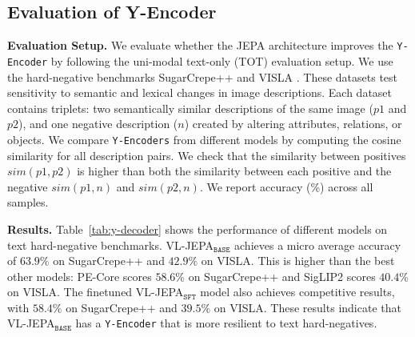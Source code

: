 \subsection{Evaluation of Y-Encoder}
\label{sec:exp.y-encoder}


\textbf{Evaluation Setup.} We evaluate whether the JEPA architecture improves the \texttt{Y-Encoder} by following the uni-modal text-only (TOT) evaluation setup.  
We use the hard-negative benchmarks SugarCrepe++ \citep{10.5555/3737916.3738487} and VISLA \citep{dumpala2024vislabenchmarkevaluatingembedding}.  
These datasets test sensitivity to semantic and lexical changes in image descriptions.  
Each dataset contains triplets: two semantically similar descriptions of the same image ($p1$ and $p2$), and one negative description ($n$) created by altering attributes, relations, or objects.  
We compare \texttt{Y-Encoders} from different models by computing the cosine similarity for all description pairs.  
We check that the similarity between positives $sim(p1,p2)$ is higher than both the similarity between each positive and the negative $sim(p1,n)$ and $sim(p2,n)$.  
We report accuracy (\%) across all samples.


\textbf{Results.} Table~\ref{tab:y-decoder} shows the performance of different models on text hard-negative benchmarks.
VL-JEPA$_\texttt{BASE}$ achieves a micro average accuracy of $63.9\%$ on SugarCrepe++ and $42.9\%$ on VISLA.
This is higher than the best other models: PE-Core scores $58.6\%$ on SugarCrepe++ and SigLIP2 scores $40.4\%$ on VISLA.
The finetuned VL-JEPA$_\texttt{SFT}$ model also achieves competitive results, with $58.4\%$ on SugarCrepe++ and $39.5\%$ on VISLA.
These results indicate that VL-JEPA$_\texttt{BASE}$ has a \texttt{Y-Encoder} that is more resilient to text hard-negatives.




